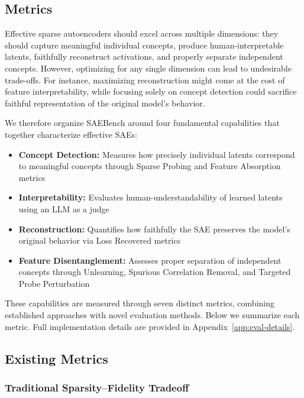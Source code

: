 \documentclass{article}
\theoremstyle{plain}
\theoremstyle{definition}
\theoremstyle{remark}
\begin{document}
\subsection{Metrics}
Effective sparse autoencoders should excel across multiple dimensions: they should capture meaningful individual concepts, produce human-interpretable latents, faithfully reconstruct activations, and properly separate independent concepts. However, optimizing for any single dimension can lead to undesirable trade-offs. For instance, maximizing reconstruction might come at the cost of feature interpretability, while focusing solely on concept detection could sacrifice faithful representation of the original model's behavior.

We therefore organize SAEBench around four fundamental capabilities that together characterize effective SAEs:
\begin{itemize}
    \item \textbf{Concept Detection:} Measures how precisely individual latents correspond to meaningful concepts through Sparse Probing and Feature Absorption metrics
    \item \textbf{Interpretability:} Evaluates human-understandability of learned latents using an LLM as a judge
    \item \textbf{Reconstruction:} Quantifies how faithfully the SAE preserves the model's original behavior via Loss Recovered metrics
    \item \textbf{Feature Disentanglement:} Assesses proper separation of independent concepts through Unlearning, Spurious Correlation Removal, and Targeted Probe Perturbation
\end{itemize}

These capabilities are measured through seven distinct metrics, combining established approaches with novel evaluation methods. Below we summarize each metric. Full implementation details are provided in Appendix~\ref{app:eval-details}.


\subsection{Existing Metrics}

\subsubsection{Traditional  Sparsity--Fidelity Tradeoff}
\label{sec: core}
\end{document}
